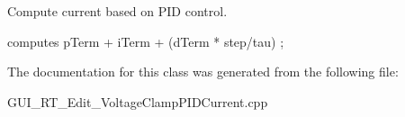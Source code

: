 Compute current based on P\+I\+D control. 


\begin{DoxyPre}
\begin{DoxyVerb}      computes pTerm + iTerm + (dTerm * step/tau)  ;
\end{DoxyVerb}

\end{DoxyPre}
 

The documentation for this class was generated from the following file\+:\begin{DoxyCompactItemize}
\item 
G\+U\+I\+\_\+\+R\+T\+\_\+\+Edit\+\_\+\+Voltage\+Clamp\+P\+I\+D\+Current.\+cpp\end{DoxyCompactItemize}
